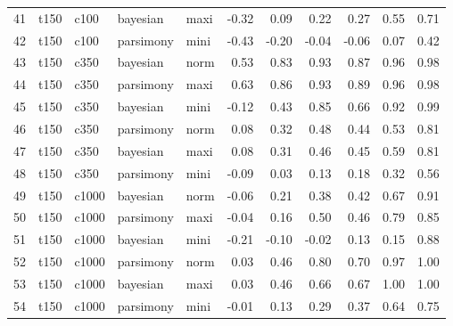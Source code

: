 \documentclass[12pt,letterpaper]{article}
\begin{document}
\begin{longtable}{rllllrrrrrr}
  41 & t150 & c100 & bayesian & maxi & -0.32 & 0.09 & 0.22 & 0.27 & 0.55 & 0.71 \\ 
  42 & t150 & c100 & parsimony & mini & -0.43 & -0.20 & -0.04 & -0.06 & 0.07 & 0.42 \\ 
  43 & t150 & c350 & bayesian & norm & 0.53 & 0.83 & 0.93 & 0.87 & 0.96 & 0.98 \\ 
  44 & t150 & c350 & parsimony & maxi & 0.63 & 0.86 & 0.93 & 0.89 & 0.96 & 0.98 \\ 
  45 & t150 & c350 & bayesian & mini & -0.12 & 0.43 & 0.85 & 0.66 & 0.92 & 0.99 \\ 
  46 & t150 & c350 & parsimony & norm & 0.08 & 0.32 & 0.48 & 0.44 & 0.53 & 0.81 \\ 
  47 & t150 & c350 & bayesian & maxi & 0.08 & 0.31 & 0.46 & 0.45 & 0.59 & 0.81 \\ 
  48 & t150 & c350 & parsimony & mini & -0.09 & 0.03 & 0.13 & 0.18 & 0.32 & 0.56 \\ 
  49 & t150 & c1000 & bayesian & norm & -0.06 & 0.21 & 0.38 & 0.42 & 0.67 & 0.91 \\ 
  50 & t150 & c1000 & parsimony & maxi & -0.04 & 0.16 & 0.50 & 0.46 & 0.79 & 0.85 \\ 
  51 & t150 & c1000 & bayesian & mini & -0.21 & -0.10 & -0.02 & 0.13 & 0.15 & 0.88 \\ 
  52 & t150 & c1000 & parsimony & norm & 0.03 & 0.46 & 0.80 & 0.70 & 0.97 & 1.00 \\ 
  53 & t150 & c1000 & bayesian & maxi & 0.03 & 0.46 & 0.66 & 0.67 & 1.00 & 1.00 \\ 
  54 & t150 & c1000 & parsimony & mini & -0.01 & 0.13 & 0.29 & 0.37 & 0.64 & 0.75 \\ 
   \hline
\end{longtable}
\end{document}

